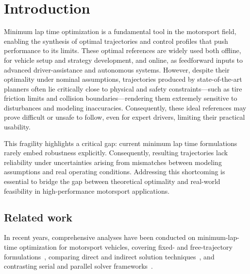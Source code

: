 \section{Introduction}
\label{sec:intro}

Minimum lap time optimization is a fundamental tool in the motorsport field, enabling the synthesis of optimal trajectories and control profiles that push performance to its limits. These optimal references are widely used both offline, for vehicle setup and strategy development, and online, as feedforward inputs to advanced driver-assistance and autonomous systems.
However, despite their optimality under nominal assumptions, trajectories produced by state-of-the-art planners often lie critically close to physical and safety constraints---such as tire friction limits and collision boundaries---rendering them extremely sensitive to disturbances and modeling inaccuracies. Consequently, these ideal references may prove difficult or unsafe to follow, even for expert drivers, limiting their practical usability.

This fragility highlights a critical gap: current minimum lap time formulations rarely embed robustness explicitly.
Consequently, resulting trajectories lack reliability under uncertainties arising from mismatches between modeling assumptions and real operating conditions.
Addressing this shortcoming is essential to bridge the gap between theoretical optimality and real-world feasibility in high-performance motorsport applications.

\subsection{Related work}
In recent years, comprehensive analyses have been conducted on minimum-lap-time optimization for motorsport vehicles, covering fixed- and free-trajectory formulations~\cite{Veneri:FreetrajectoryQuasisteadystateOptimalcontrol:2020, Lovato:ThreedimensionalFixedtrajectoryApproaches:2022, Lovato:ThreedimensionalFreetrajectoryQuasisteadystate:2022}, comparing direct and indirect solution techniques~\cite{DalBianco:ComparisonDirectIndirect:2019, Bertolazzi:DirectIndirectApproach:2025}, and contrasting serial and parallel solver frameworks~\cite{Biniewicz:QuasisteadystateMinimumLap:2024, Bartali:SchwarzDecompositionParallel:2024, Bartali:ConsensusbasedAlternatingDirection:2024}.

